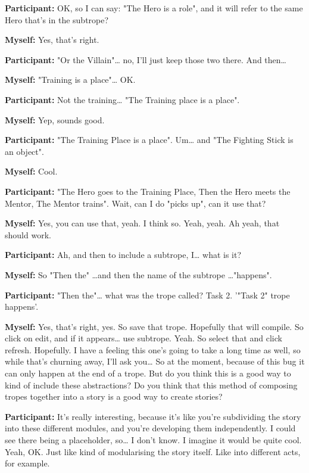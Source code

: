 \documentclass[11pt]{report}
\newcommand{\llabel}[1]{\hypertarget{llineno:#1}{\linelabel{#1}}}
\begin{document}
\begin{linenumbers}
\textbf{Participant:} OK, so I can say: "The Hero is a role", and it will refer to the same Hero that's in the subtrope?

\textbf{Myself:} Yes, that's right.

\textbf{Participant:} "Or the Villain"\ldots{} no, I'll just keep those two there. And then\ldots{}

\textbf{Myself:} "Training is a place"\ldots{} OK.

\textbf{Participant:} Not the training\ldots{} "The Training place is a place".

\textbf{Myself:} Yep, sounds good.

\textbf{Participant:} "The Training Place is a place". Um\ldots{} and "The Fighting Stick is an object".

\textbf{Myself:} Cool.

\textbf{Participant:} "The Hero goes to the Training Place, Then the Hero meets the Mentor, The Mentor trains". Wait, can I do "picks up", can it use that?

\textbf{Myself:} Yes, you can use that, yeah. I think so. Yeah, yeah. Ah yeah, that should work.

\textbf{Participant:} Ah, and then to include a subtrope, I\ldots{} what is it?

\textbf{Myself:} So "Then the" \ldots{}and then the name of the subtrope \ldots{}"happens".

\textbf{Participant:} "Then the"\ldots{} what was the trope called? Task 2. '"Task 2" trope happens'.

\textbf{Myself:} Yes, that's right, yes. So save that trope. Hopefully that will compile. So click on edit, and if it appears\ldots{} use subtrope. Yeah. So select that and click refresh. Hopefully. I have a feeling this one's going to take a long time as well, so while that's churning away, I'll ask you\ldots{} So at the moment, because of this bug it can only happen at the end of a trope. But do you think this is a good way to kind of include these abstractions? Do you think that this method of composing tropes together into a story is a good way to create stories?

\textbf{Participant:} It's really interesting, because it's like you're subdividing the story into these different modules, and you're developing them independently. I could see there being a placeholder, so\ldots{} I don't know. I imagine it would be quite cool. Yeah, OK. Just like kind of modularising the story itself. Like into different acts, for example.\llabel{lne:use3e}


\end{linenumbers}
\end{document}
